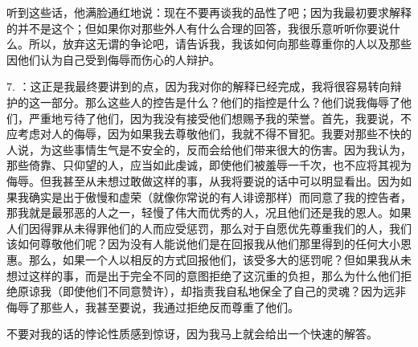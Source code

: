 听到这些话，他满脸通红地说：现在不要再谈我的品性了吧；因为我最初要求解释的并不是这个；但如果你对那些外人有什么合理的回答，我很乐意听听你要说什么。所以，放弃这无谓的争论吧，请告诉我，我该如何向那些尊重你的人以及那些因他们认为自己受到侮辱而伤心的人辩护。\par

7. ：这正是我最终要讲到的点，因为我对你的解释已经完成，我将很容易转向辩护的这一部分。那么这些人的控告是什么？他们的指控是什么？他们说我侮辱了他们，严重地亏待了他们，因为我没有接受他们想赐予我的荣誉。首先，我要说，不应考虑对人的侮辱，因为如果我去尊敬他们，我就不得不冒犯。我要对那些不快的人说，为这些事情生气是不安全的，反而会给他们带来很大的伤害。因为我认为，那些倚靠、只仰望的人，应当如此虔诚，即使他们被羞辱一千次，也不应将其视为侮辱。但我甚至从未想过敢做这样的事，从我将要说的话中可以明显看出。因为如果我确实是出于傲慢和虚荣（就像你常说的有人诽谤那样）而同意了我的控告者，那我就是最邪恶的人之一，轻慢了伟大而优秀的人，况且他们还是我的恩人。如果人们因得罪从未得罪他们的人而应受惩罚，那么对于自愿优先尊重我们的人，我们该如何尊敬他们呢？因为没有人能说他们是在回报我从他们那里得到的任何大小恩惠。那么，如果一个人以相反的方式回报他们，该受多大的惩罚呢？但如果我从未想过这样的事，而是出于完全不同的意图拒绝了这沉重的负担，那么为什么他们拒绝原谅我（即使他们不同意赞许），却指责我自私地保全了自己的灵魂？因为远非侮辱了那些人，我甚至要说，我通过拒绝反而尊重了他们。\par

不要对我的话的悖论性质感到惊讶，因为我马上就会给出一个快速的解答。\par

